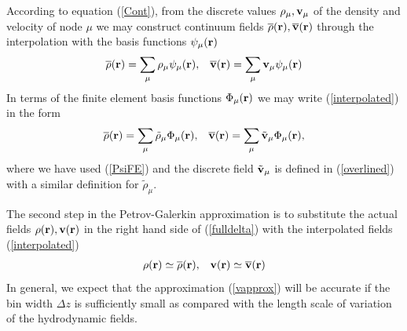 \documentclass[b5paper,openright,10pt]{book}
\begin{document}
According  to equation  (\ref{Cont}), from  the discrete  values $\rho_\mu,
{\bf  v}_\mu$  of the  density  and  velocity  of  node $\mu$  we  may
construct  continuum  fields  $\overline{\rho}({\bf  r}),\overline{\bf
  v}({\bf  r})$ through  the  interpolation with  the basis  functions
$\psi_\mu({\bf r})$
\begin{align}
    \overline{\rho}({\bf r})=\sum_\mu{\rho}_\mu\psi_\mu({\bf r}), &&
\overline{\bf  v}({\bf r})=\sum_\mu{\bf v}_\mu \psi_\mu({\bf r})
\label{interpolated}
\end{align}
In terms of  the finite element basis functions $\Phi_\mu({\bf r})$ we may write
(\ref{interpolated})  in the form 
\begin{align}
    \overline{\rho}({\bf r})=\sum_\mu\tilde{\rho}_\mu\Phi_\mu({\bf r}), &&
\overline{\bf  v}({\bf r})= \sum_\mu\tilde{\bf v}_\mu\Phi_\mu({\bf r}),
\label{interpolated2}
\end{align}
where  we  have  used  (\ref{PsiFE})   and  the   discrete  field
$\tilde{\bf  v}_\mu$ is  defined in  (\ref{overlined}) with  a similar
definition for $\tilde{\rho}_\mu$.

The second step in the  Petrov-Galerkin approximation is to substitute
the actual fields $\rho({\bf r}), {\bf  v}({\bf r})$ in the right hand
side    of   (\ref{fulldelta})    with    the   interpolated    fields
(\ref{interpolated})
\begin{align}
    {\rho}({\bf r})\simeq \overline{\rho}({\bf r}), &&
 {\bf v}({\bf r})\simeq \overline{\bf v}({\bf r})
\label{vapprox}
\end{align}
In general, we  expect that the approximation  (\ref{vapprox}) will be
accurate if the bin width $\Delta z$ is sufficiently small as compared
with  the  length  scale  of variation  of  the  hydrodynamic  fields.
\end{document}
